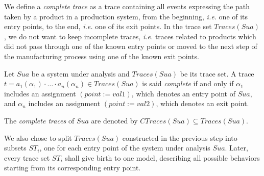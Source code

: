 We define a \textit{complete trace} as a trace containing all
events expressing the path taken by a product in a production
system, from the beginning, \emph{i.e.} one of its entry points,
to the end, \emph{i.e.} one of its exit points. In the trace set
$Traces(Sua)$, we do not want to keep incomplete traces,
\emph{i.e.}  traces related to products which did not pass
through one of the known entry points or moved to the next step
of the manufacturing process using one of the known exit points.

\begin{definition}
    Let $\mathit{Sua}$ be a system under analysis and
    $Traces({Sua})$ be its trace set. A trace $t=a_1(\alpha_1)
    \cdot \dots \cdot a_n(\alpha_n) \in Traces({Sua})$ is said
    \emph{complete} if and only if $\alpha_1$ includes an
    assignment $(point:=val1)$, which denotes an entry point of
    $\mathit{Sua}$, and $\alpha_n$ includes an assignment
    $(point:=val2)$, which denotes an exit point.

    The \emph{complete traces} of $\mathit{Sua}$ are denoted by
    $CTraces({Sua}) \subseteq Traces({Sua})$.
\end{definition}

We also chose to split $Traces(Sua)$ constructed in the previous step
into subsets $ST_i$, one for each entry point of the system under
analysis $\mathit{Sua}$. Later, every trace set $ST_i$ shall give
birth to one model, describing all possible behaviors starting
from its corresponding entry point.


